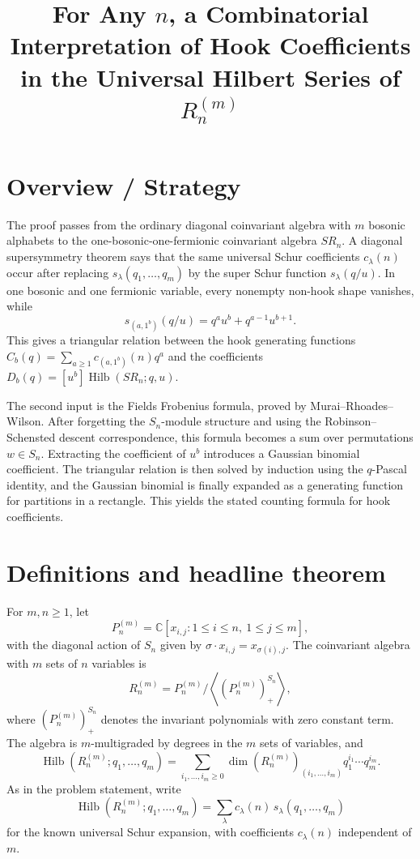 \documentclass[12pt]{article}
\title{For Any \(n\), a Combinatorial Interpretation of Hook Coefficients in the Universal Hilbert Series of \(R_n^{(m)}\)}
\author{}
\date{}
\DeclareMathOperator{\Hilb}{Hilb}
\begin{document}
\maketitle

\section*{Overview / Strategy}

The proof passes from the ordinary diagonal coinvariant algebra with \(m\) bosonic alphabets to the one-bosonic-one-fermionic coinvariant algebra \(SR_n\).  A diagonal supersymmetry theorem says that the same universal Schur coefficients \(c_\lambda(n)\) occur after replacing \(s_\lambda(q_1,\ldots,q_m)\) by the super Schur function \(s_\lambda(q/u)\).  In one bosonic and one fermionic variable, every nonempty non-hook shape vanishes, while
\[
s_{(a,1^b)}(q/u)=q^a u^b+q^{a-1}u^{b+1}.
\]
This gives a triangular relation between the hook generating functions \(C_b(q)=\sum_{a\ge 1}c_{(a,1^b)}(n)q^a\) and the coefficients \(D_b(q)=[u^b]\Hilb(SR_n;q,u)\).

The second input is the Fields Frobenius formula, proved by Murai--Rhoades--Wilson.  After forgetting the \(S_n\)-module structure and using the Robinson--Schensted descent correspondence, this formula becomes a sum over permutations \(w\in S_n\).  Extracting the coefficient of \(u^b\) introduces a Gaussian binomial coefficient.  The triangular relation is then solved by induction using the \(q\)-Pascal identity, and the Gaussian binomial is finally expanded as a generating function for partitions in a rectangle.  This yields the stated counting formula for hook coefficients.

\section{Definitions and headline theorem}

For \(m,n\ge 1\), let
\[
P_n^{(m)}=\mathbb C[x_{i,j}:1\le i\le n,\ 1\le j\le m],
\]
with the diagonal action of \(S_n\) given by \(\sigma\cdot x_{i,j}=x_{\sigma(i),j}\).  The coinvariant algebra with \(m\) sets of \(n\) variables is
\[
R_n^{(m)}
=
P_n^{(m)}\big/
\left\langle \left(P_n^{(m)}\right)^{S_n}_{+}\right\rangle,
\]
where \(\left(P_n^{(m)}\right)^{S_n}_{+}\) denotes the invariant polynomials with zero constant term.  The algebra is \(m\)-multigraded by degrees in the \(m\) sets of variables, and
\[
\Hilb(R_n^{(m)};q_1,\ldots,q_m)
=
\sum_{i_1,\ldots,i_m\ge 0}
\dim\!\left(R_n^{(m)}\right)_{(i_1,\ldots,i_m)}
q_1^{i_1}\cdots q_m^{i_m}.
\]
As in the problem statement, write
\[
\Hilb(R_n^{(m)};q_1,\ldots,q_m)
=
\sum_{\lambda} c_\lambda(n)\,s_\lambda(q_1,\ldots,q_m)
\]
for the known universal Schur expansion, with coefficients \(c_\lambda(n)\) independent of \(m\).
\end{document}
